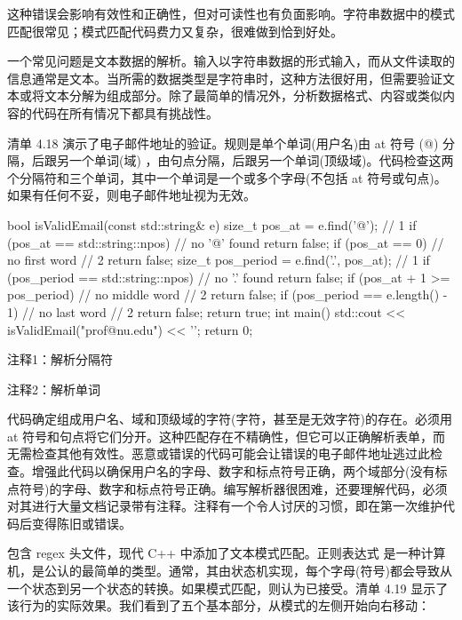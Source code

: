 这种错误会影响有效性和正确性，但对可读性也有负面影响。字符串数据中的模式匹配很常见；模式匹配代码费力又复杂，很难做到恰到好处。


一个常见问题是文本数据的解析。输入以字符串数据的形式输入，而从文件读取的信息通常是文本。当所需的数据类型是字符串时，这种方法很好用，但需要验证文本或将文本分解为组成部分。除了最简单的情况外，分析数据格式、内容或类似内容的代码在所有情况下都具有挑战性。

清单 4.18 演示了电子邮件地址的验证。规则是单个单词(用户名)由 at 符号 (@) 分隔，后跟另一个单词(域) ，由句点分隔，后跟另一个单词(顶级域)。代码检查这两个分隔符和三个单词，其中一个单词是一个或多个字母(不包括 at 符号或句点)。如果有任何不妥，则电子邮件地址视为无效。


\begin{cpp}
bool isValidEmail(const std::string& e) {
  size_t pos_at = e.find('@'); // 1
  if (pos_at == std::string::npos) // no '@' found
  return false;
  if (pos_at == 0) // no first word // 2
    return false;
  size_t pos_period = e.find('.', pos_at); // 1
  if (pos_period == std::string::npos) // no '.' found
    return false;
  if (pos_at + 1 >= pos_period) // no middle word // 2
    return false;
  if (pos_period == e.length() - 1) // no last word // 2
    return false;
  return true;
}
int main() {
  std::cout << isValidEmail("prof@nu.edu") << '\n';
  return 0;
}
\end{cpp}

{\footnotesize
注释1：解析分隔符

注释2：解析单词
}


代码确定组成用户名、域和顶级域的字符(字符，甚至是无效字符)的存在。必须用 at 符号和句点将它们分开。这种匹配存在不精确性，但它可以正确解析表单，而无需检查其他有效性。恶意或错误的代码可能会让错误的电子邮件地址逃过此检查。增强此代码以确保用户名的字母、数字和标点符号正确，两个域部分(没有标点符号)的字母、数字和标点符号正确。编写解析器很困难，还要理解代码，必须对其进行大量文档记录带有注释。注释有一个令人讨厌的习惯，即在第一次维护代码后变得陈旧或错误。


包含 regex 头文件，现代 C++ 中添加了文本模式匹配。正则表达式 是一种计算机，是公认的最简单的类型。通常，其由状态机实现，每个字母(符号)都会导致从一个状态到另一个状态的转换。如果模式匹配，则认为已接受。清单 4.19 显示了该行为的实际效果。我们看到了五个基本部分，从模式的左侧开始向右移动：

